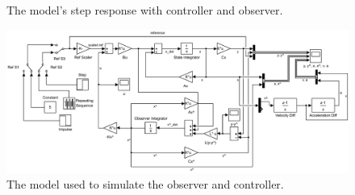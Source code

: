 \documentclass[final]{scrreprt} %
\begin{document}
\begin{figure}[H]
	\centering
    	\setlength\figureheight{4cm}
    	\setlength{}
    	    	
    	\caption{The model’s step response with controller and observer.}
    	\label{fig:model-step-response}
\end{figure}
\begin{figure}[H]
	\vspace*{-1.8cm}
	\centering    	
    	\includegraphics[angle=90, height=1.2\textheight]{resources/model.pdf}
    	\caption{The model used to simulate the observer and controller.}
    	\label{fig:simulink-model}
\end{figure}
\end{document}
